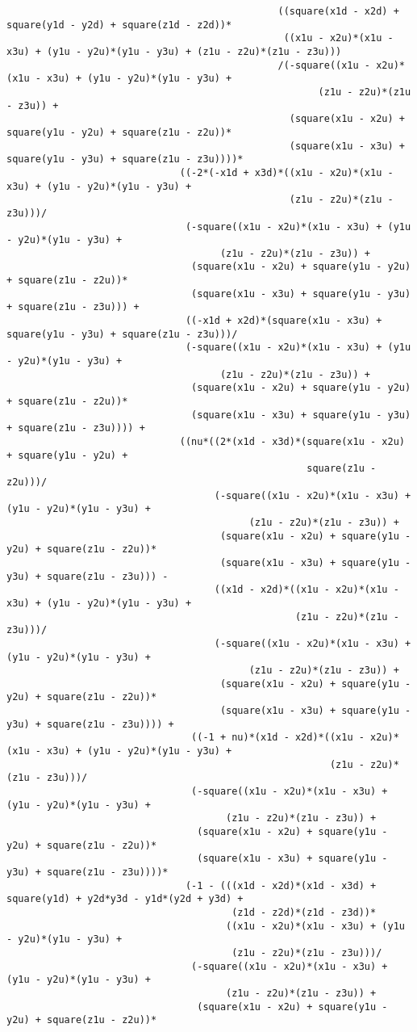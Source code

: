 \begin{lstlisting}
											   ((square(x1d - x2d) + square(y1d - y2d) + square(z1d - z2d))*
												((x1u - x2u)*(x1u - x3u) + (y1u - y2u)*(y1u - y3u) + (z1u - z2u)*(z1u - z3u)))
											   /(-square((x1u - x2u)*(x1u - x3u) + (y1u - y2u)*(y1u - y3u) + 
													  (z1u - z2u)*(z1u - z3u)) + 
												 (square(x1u - x2u) + square(y1u - y2u) + square(z1u - z2u))*
												 (square(x1u - x3u) + square(y1u - y3u) + square(z1u - z3u))))*
							  ((-2*(-x1d + x3d)*((x1u - x2u)*(x1u - x3u) + (y1u - y2u)*(y1u - y3u) + 
												 (z1u - z2u)*(z1u - z3u)))/
							   (-square((x1u - x2u)*(x1u - x3u) + (y1u - y2u)*(y1u - y3u) + 
									 (z1u - z2u)*(z1u - z3u)) + 
								(square(x1u - x2u) + square(y1u - y2u) + square(z1u - z2u))*
								(square(x1u - x3u) + square(y1u - y3u) + square(z1u - z3u))) + 
							   ((-x1d + x2d)*(square(x1u - x3u) + square(y1u - y3u) + square(z1u - z3u)))/
							   (-square((x1u - x2u)*(x1u - x3u) + (y1u - y2u)*(y1u - y3u) + 
									 (z1u - z2u)*(z1u - z3u)) + 
								(square(x1u - x2u) + square(y1u - y2u) + square(z1u - z2u))*
								(square(x1u - x3u) + square(y1u - y3u) + square(z1u - z3u)))) + 
							  ((nu*((2*(x1d - x3d)*(square(x1u - x2u) + square(y1u - y2u) + 
													square(z1u - z2u)))/
									(-square((x1u - x2u)*(x1u - x3u) + (y1u - y2u)*(y1u - y3u) + 
										  (z1u - z2u)*(z1u - z3u)) + 
									 (square(x1u - x2u) + square(y1u - y2u) + square(z1u - z2u))*
									 (square(x1u - x3u) + square(y1u - y3u) + square(z1u - z3u))) - 
									((x1d - x2d)*((x1u - x2u)*(x1u - x3u) + (y1u - y2u)*(y1u - y3u) + 
												  (z1u - z2u)*(z1u - z3u)))/
									(-square((x1u - x2u)*(x1u - x3u) + (y1u - y2u)*(y1u - y3u) + 
										  (z1u - z2u)*(z1u - z3u)) + 
									 (square(x1u - x2u) + square(y1u - y2u) + square(z1u - z2u))*
									 (square(x1u - x3u) + square(y1u - y3u) + square(z1u - z3u)))) + 
								((-1 + nu)*(x1d - x2d)*((x1u - x2u)*(x1u - x3u) + (y1u - y2u)*(y1u - y3u) + 
														(z1u - z2u)*(z1u - z3u)))/
								(-square((x1u - x2u)*(x1u - x3u) + (y1u - y2u)*(y1u - y3u) + 
									  (z1u - z2u)*(z1u - z3u)) + 
								 (square(x1u - x2u) + square(y1u - y2u) + square(z1u - z2u))*
								 (square(x1u - x3u) + square(y1u - y3u) + square(z1u - z3u))))*
							   (-1 - (((x1d - x2d)*(x1d - x3d) + square(y1d) + y2d*y3d - y1d*(y2d + y3d) + 
									   (z1d - z2d)*(z1d - z3d))*
									  ((x1u - x2u)*(x1u - x3u) + (y1u - y2u)*(y1u - y3u) + 
									   (z1u - z2u)*(z1u - z3u)))/
								(-square((x1u - x2u)*(x1u - x3u) + (y1u - y2u)*(y1u - y3u) + 
									  (z1u - z2u)*(z1u - z3u)) + 
								 (square(x1u - x2u) + square(y1u - y2u) + square(z1u - z2u))*

\end{lstlisting}
